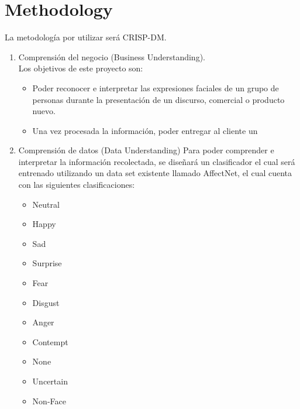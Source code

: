 
\section{Methodology}

La metodología por utilizar será CRISP-DM.\@
\begin{enumerate}
      \item Comprensión del negocio (Business Understanding). \\Los objetivos de este
            proyecto son:
            \begin{itemize}
                  \item Poder reconocer e interpretar las expresiones faciales de un grupo de personas
                        durante la presentación de un discurso, comercial o producto nuevo.
                  \item Una vez procesada la información, poder entregar al cliente un
            \end{itemize}

      \item Comprensión de datos (Data Understanding) Para poder comprender e interpretar
            la información recolectada, se diseñará un clasificador el cual será entrenado
            utilizando un data set existente llamado AffectNet\cite[]{mollahosseini2017affectnet}, el cual
            cuenta con las siguientes clasificaciones:
            \begin{itemize}
                  \item Neutral
                  \item Happy
                  \item Sad
                  \item Surprise
                  \item Fear
                  \item Disgust
                  \item Anger
                  \item Contempt
                  \item None
                  \item Uncertain
                  \item Non-Face
            \end{itemize}


\end{enumerate}
